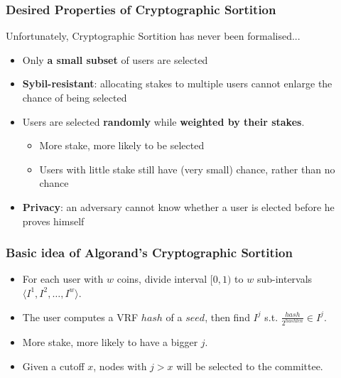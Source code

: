 \documentclass{beamer}
\begin{document}
\begin{frame}
\frametitle{Desired Properties of Cryptographic Sortition}

Unfortunately, Cryptographic Sortition has never been formalised...

\begin{itemize}
    \item Only \textbf{a small subset} of users are selected
    \item \textbf{Sybil-resistant}: allocating stakes to multiple users cannot enlarge the chance of being selected
    \item Users are selected \textbf{randomly} while \textbf{weighted by their stakes}.
    \begin{itemize}
        \item More stake, more likely to be selected
        \item Users with little stake still have (very small) chance, rather than no chance
    \end{itemize}
    \item \textbf{Privacy}: an adversary cannot know whether a user is elected before he proves himself
\end{itemize}
    
\end{frame}

\begin{frame}
\frametitle{Basic idea of Algorand's Cryptographic Sortition}

\begin{itemize}
    \item For each user with $w$ coins, divide interval $[0, 1)$ to $w$ sub-intervals $\langle I^1, I^2, \dots, I^w \rangle$.
    \item The user computes a VRF $hash$ of a $seed$, then find $I^j$ s.t. $\frac{hash}{2^{hashlen}} \in I^j$.
    \item More stake, more likely to have a bigger $j$.
    \item Given a cutoff $x$, nodes with $j > x$ will be selected to the committee.
\end{itemize}
    
\end{frame}
\end{document}
